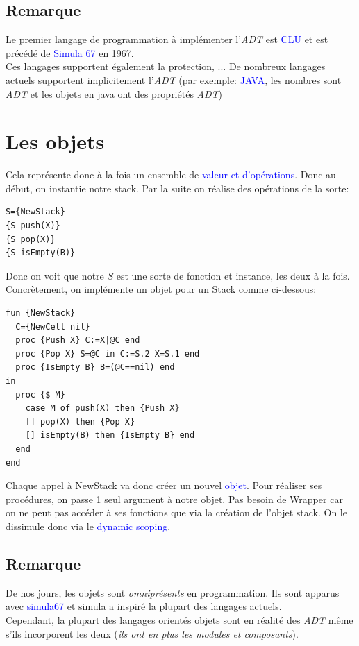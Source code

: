 \documentclass{report}
\begin{document}
\subsection{Remarque}
Le premier langage de programmation à implémenter l'\textit{ADT} est \textcolor{blue}{CLU} et est précédé de \textcolor{blue}{Simula 67} en 1967.\\
Ces langages supportent également la protection, ... De nombreux langages actuels supportent implicitement l'\textit{ADT} (par exemple: \textcolor{blue}{JAVA}, les nombres sont \textit{ADT} et les objets en java ont des propriétés \textit{ADT})

\section{Les objets}
Cela représente donc à la fois un ensemble de \textcolor{blue}{valeur et d'opérations}. Donc au début, on instantie notre stack. Par la suite on réalise des opérations de la sorte:
\begin{lstlisting}[escapechar=\%]
S={NewStack} 
{S push(X)} 
{S pop(X)}
{S isEmpty(B)}
\end{lstlisting}
Donc on voit que notre $S$ est une sorte de fonction et instance, les deux à la fois. Concrètement, on implémente un objet pour un Stack comme ci-dessous:
\begin{lstlisting}[escapechar=\%]
fun {NewStack} 
  C={NewCell nil} 
  proc {Push X} C:=X|@C end 
  proc {Pop X} S=@C in C:=S.2 X=S.1 end 
  proc {IsEmpty B} B=(@C==nil) end
in
  proc {$ M}
    case M of push(X) then {Push X} 
    [] pop(X) then {Pop X} 
    [] isEmpty(B) then {IsEmpty B} end
  end
end
\end{lstlisting}
Chaque appel à NewStack va donc créer un nouvel \textcolor{blue}{objet}. Pour réaliser ses procédures, on passe 1 seul argument à notre objet. Pas besoin de Wrapper car on ne peut pas accéder à ses fonctions que via la création de l'objet stack. On le dissimule donc via le \textcolor{blue}{dynamic scoping}.

\subsection{Remarque}
De nos jours, les objets sont \textit{omniprésents} en programmation. Ils sont apparus avec \textcolor{blue}{simula67} et simula a inspiré la plupart des langages actuels.\\
Cependant, la plupart des langages orientés objets sont en réalité des \textit{ADT} même s'ils incorporent les deux (\textit{ils ont en plus les modules et composants}).
\end{document}
